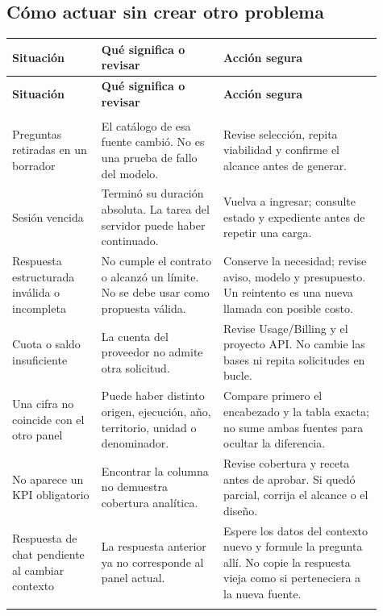 \subsection{Cómo actuar sin crear otro problema}
\begingroup
\fontsize{10}{12.5}\selectfont
\setlength{\tabcolsep}{5pt}
\renewcommand{\arraystretch}{1.15}
\begin{longtable}{@{}>{\RaggedRight\arraybackslash}p{0.22\linewidth}>{\RaggedRight\arraybackslash}p{0.3\linewidth}>{\RaggedRight\arraybackslash}p{0.39\linewidth}@{}}
\toprule
\textbf{Situación} & \textbf{Qué significa o revisar} & \textbf{Acción segura} \\
\midrule
\endfirsthead
\toprule
\textbf{Situación} & \textbf{Qué significa o revisar} & \textbf{Acción segura} \\
\midrule
\endhead
\midrule
\multicolumn{3}{r}{\footnotesize Continúa en la página siguiente}\\
\endfoot
\bottomrule
\endlastfoot
Preguntas retiradas en un borrador & El catálogo de esa fuente cambió. No es una prueba de fallo del modelo. & Revise selección, repita viabilidad y confirme el alcance antes de generar. \\
\addlinespace[3pt]
Sesión vencida & Terminó su duración absoluta. La tarea del servidor puede haber continuado. & Vuelva a ingresar; consulte estado y expediente antes de repetir una carga. \\
\addlinespace[3pt]
Respuesta estructurada inválida o incompleta & No cumple el contrato o alcanzó un límite. No se debe usar como propuesta válida. & Conserve la necesidad; revise aviso, modelo y presupuesto. Un reintento es una nueva llamada con posible costo. \\
\addlinespace[3pt]
Cuota o saldo insuficiente & La cuenta del proveedor no admite otra solicitud. & Revise Usage/Billing y el proyecto API. No cambie las bases ni repita solicitudes en bucle. \\
\addlinespace[3pt]
Una cifra no coincide con el otro panel & Puede haber distinto origen, ejecución, año, territorio, unidad o denominador. & Compare primero el encabezado y la tabla exacta; no sume ambas fuentes para ocultar la diferencia. \\
\addlinespace[3pt]
No aparece un KPI obligatorio & Encontrar la columna no demuestra cobertura analítica. & Revise cobertura y receta antes de aprobar. Si quedó parcial, corrija el alcance o el diseño. \\
\addlinespace[3pt]
Respuesta de chat pendiente al cambiar contexto & La respuesta anterior ya no corresponde al panel actual. & Espere los datos del contexto nuevo y formule la pregunta allí. No copie la respuesta vieja como si perteneciera a la nueva fuente. \\
\addlinespace[3pt]
\end{longtable}
\endgroup

